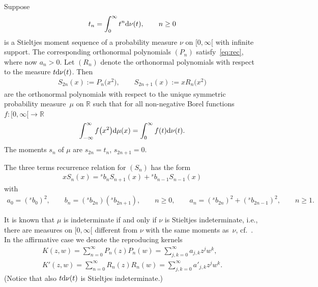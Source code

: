 \documentclass[pdftex]{sigma}
\numberwithin{equation}{section}
\begin{document}
Suppose
\begin{gather*}
t_n=\int_0^\infty t^n{\rm d}\nu(t),\qquad n\ge 0
\end{gather*}
is a Stieltjes moment sequence of a probability measure $\nu$ on $[0,\infty[$ with infinite support. The corresponding orthonormal polynomials $(P_n)$ satisfy~\eqref{eq:rec}, where now $a_n>0$. Let $(R_n)$ denote the orthonormal polynomials with respect to the measure $t{\rm d}\nu(t)$. Then
\begin{gather*}
S_{2n}(x):=P_n\big(x^2\big),\qquad S_{2n+1}(x):=xR_n\big(x^2\big)
\end{gather*}
are the orthonormal polynomials with respect to the unique symmetric probability measure~$\mu$ on $\mathbb R$ such that for all non-negative Borel functions $f\colon [0,\infty[\to\mathbb R$
\begin{gather*}
\int_{-\infty}^\infty f\big(x^2\big){\rm d}\mu(x)=\int_0^\infty f(t){\rm d}\nu(t).
\end{gather*}
The moments $s_n$ of $\mu$ are $s_{2n}=t_n$, $s_{2n+1}=0$.

The three terms recurrence relation for $(S_n)$ has the form
\begin{gather}\label{eq:recsym(s)}
xS_n(x)={}^sb_ n S_{n+1}(x)+{}^sb_{n-1}S_{n-1}(x)
\end{gather}
with
\begin{gather*}
a_0=({}^sb_0)^2,\qquad b_n=({}^sb_{2n})({}^sb_{2n+1}),\qquad n\ge 0, \qquad a_n=({}^sb_{2n})^2+({}^s b_{2n-1})^2,\qquad n\ge 1.
\end{gather*}

It is known that $\mu$ is indeterminate if and only if $\nu$ is Stieltjes indeterminate, i.e., there are measures on $[0,\infty[$ different from $\nu$ with the same moments as~$\nu$, cf.~\cite[p.~333]{Ch}. In the affirmative case we denote the reproducing kernels
\begin{gather*}
K(z,w)=\sum_{n=0}^\infty P_n(z)P_n(w)=\sum_{j,k=0}^\infty a_{j,k}z^jw^k,\\
K'(z,w)=\sum_{n=0}^\infty R_n(z)R_n(w)=\sum_{j,k=0}^\infty a'_{j,k}z^jw^k.
\end{gather*}
(Notice that also $t{\rm d}\nu(t)$ is Stieltjes indeterminate.)
\end{document}
